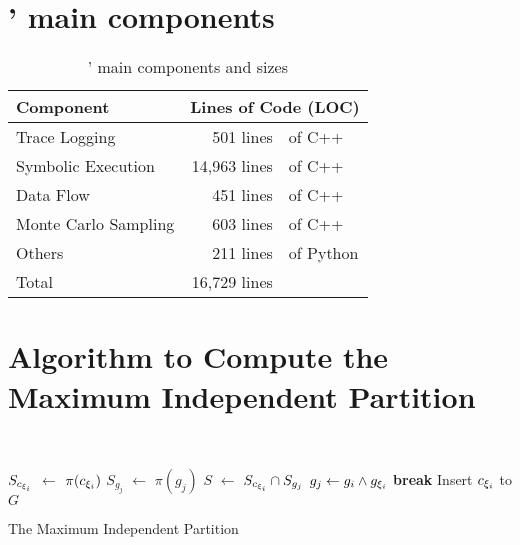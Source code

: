 
\newcommand{\vvv}{\vspace*{-3pt}}

\section{\tool{}' main components}

\label{appendix:code}
\begin{table}[h!]
    \centering
    \caption{\tool{}' main components and sizes}\label{tbl:implementation}
    \begin{tabular}{lr@{~}@{}l}
        \hline
        Component            & \multicolumn{2}{c}{Lines of Code (LOC)}             \\ \hline
        Trace Logging        & 501 lines                               & of C++    \\
        Symbolic Execution   & 14,963 lines                            & of C++    \\
        Data Flow            & 451 lines                               & of C++    \\
        Monte Carlo Sampling & 603 lines                               & of C++    \\
        Others               & 211 lines                               & of Python \\ \hline
        Total                & 16,729 lines                            &           \\\hline
    \end{tabular}
\end{table}



\section{Algorithm to Compute the Maximum Independent Partition}
\label{appendix:partition}
~
{\small
\IncMargin{1em}
\begin{algorithm}[h]\small
    \DontPrintSemicolon
    {
        $S_{c_{{\xi}_{i}}}$ $\leftarrow$ $\pi(c_{{\xi}_{i}})$ \;
        {
            $S_{g_j}$ $\leftarrow$ $\pi(g_{j})$ \;
            $S$ $\leftarrow$ $S_{c_{{\xi}_{i}}} \cap S_{g_j}$  \;
            {
                $g_{j} \leftarrow g_{i} \land g_{{\xi}_{i}}$ \;
                \textbf{break} \;
            }
            Insert $c_{{\xi}_{i}}$ to $G$
        }
    }
    \caption{The Maximum Independent Partition}
    \label{algo:max-inde}
\end{algorithm}
\DecMargin{1em}
}
~
\newpage
